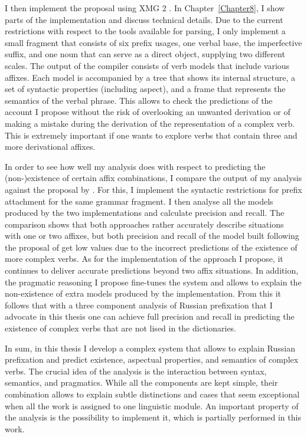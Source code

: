 I then implement the proposal using XMG 2 \citep{Petitjean:16}. In Chapter~\ref{Chapter8}, I show parts of the implementation and discuss technical details. Due to the current restrictions with respect to the tools available for parsing, I only implement a small fragment that consists of six prefix usages, one verbal base, the imperfective suffix, and one noun that can serve as a direct object, supplying two different scales. The output of the compiler consists of verb models that include various affixes. Each model is accompanied by a tree that shows its internal structure, a set of syntactic properties (including aspect), and a frame that represents the  semantics of the verbal phrase. This allows to check the predictions of the account I propose without the risk of overlooking an unwanted derivation or of making a mistake during the derivation of the representation of a complex verb. This is extremely important if one wants to explore verbs that contain three and more derivational affixes.

In order to see how well my analysis does with respect to predicting the (non-)existence of certain affix combinations, I compare the output of my analysis against the proposal by \citet{Tatevosov:09}. For this, I implement the syntactic restrictions for prefix attachment for the same grammar fragment. I then analyse all the models produced by the two implementations and calculate precision and recall. The comparison shows that both approaches rather accurately describe situations with one or two affixes, but both precision and recall of the model built following the proposal of \citet{Tatevosov:09} get low values due to the incorrect predictions of the existence of more complex verbs. As for the implementation of the approach I propose, it continues to deliver accurate predictions beyond two affix situations. In addition, the pragmatic reasoning I propose fine-tunes the system and allows to explain the non-existence of extra models produced by the implementation. From this it follows that with a three component analysis of Russian prefixation that I advocate in this thesis one can achieve full precision and recall in predicting the existence of complex verbs that are not lised in the dictionaries.

In sum, in this thesis I develop a complex system that allows to explain Russian prefixation and predict existence, aspectual properties, and semantics of complex verbs. The crucial idea of the analysis is the interaction between syntax, semantics, and pragmatics. While all the components are kept simple, their combination allows to explain subtle distinctions and cases that seem exceptional when all the work is assigned to one linguistic module. An important property of the analysis is the possibility to implement it, which is partially performed in this work.
